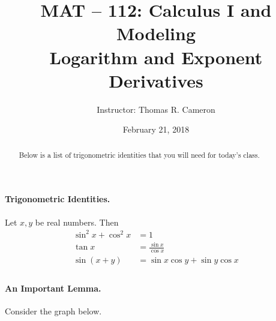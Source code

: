 \documentclass{article}
\title{MAT -- 112: Calculus I and Modeling\\
\large{Logarithm and Exponent Derivatives}}
\author{Instructor: Thomas R. Cameron}
\date{February 21, 2018}
\begin{document}
\maketitle

\begin{abstract}
Below is a list of trigonometric identities that you will need for today's class. 
\end{abstract}

\paragraph*{Trigonometric Identities.} Let $x,y$ be real numbers. Then
\begin{align*}
\sin^{2}x+\cos^{2}x &= 1 \\
\tan x &= \frac{\sin x}{\cos x} \\
\sin(x+y) &= \sin x\cos y + \sin y\cos x \\
\end{align*}

\paragraph*{An Important Lemma.}	Consider the graph below.
\begin{figure}
\centering
{}
\end{figure}

\newpage
\end{document}
